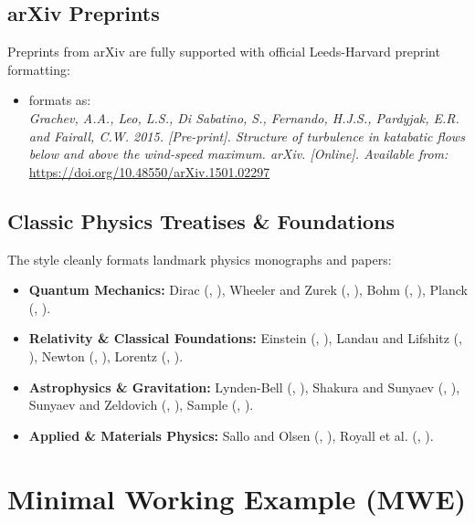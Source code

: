 \documentclass[a4paper,11pt]{article}
\begin{document}
\subsection{arXiv Preprints}
Preprints from arXiv are fully supported with official Leeds-Harvard preprint formatting:
\begin{itemize}
  \item \textcite{2015arXiv150102297G} formats as: \\
    \emph{Grachev, A.A., Leo, L.S., Di Sabatino, S., Fernando, H.J.S., Pardyjak, E.R. and Fairall, C.W. 2015. [Pre-print]. Structure of turbulence in katabatic flows below and above the wind-speed maximum. arXiv. [Online]. Available from:} \url{https://doi.org/10.48550/arXiv.1501.02297}
\end{itemize}

\subsection{Classic Physics Treatises \& Foundations}
The style cleanly formats landmark physics monographs and papers:
\begin{itemize}
  \item \textbf{Quantum Mechanics:} Dirac (\citeyear{dirac1958}, \parencite{dirac1958}), Wheeler and Zurek (\citeyear{wheeler1983}, \parencite{wheeler1983}), Bohm (\citeyear{bohm1983}, \parencite{bohm1983}), Planck (\citeyear{planck1922}, \parencite{planck1922}).
  \item \textbf{Relativity \& Classical Foundations:} Einstein (\citeyear{einstein1920}, \parencite{einstein1920}), Landau and Lifshitz (\citeyear{landau1976}, \parencite{landau1976}), Newton (\citeyear{newton1999}, \parencite{newton1999}), Lorentz (\citeyear{lorentz1952}, \parencite{lorentz1952}).
  \item \textbf{Astrophysics \& Gravitation:} Lynden-Bell (\citeyear{1967MNRAS.136..101L}, \parencite{1967MNRAS.136..101L}), Shakura and Sunyaev (\citeyear{shakura1973}, \parencite{shakura1973}), Sunyaev and Zeldovich (\citeyear{1970CoASP...2...66S}, \parencite{1970CoASP...2...66S}), Sample (\citeyear{sample2016}, \parencite{sample2016}).
  \item \textbf{Applied \& Materials Physics:} Sallo and Olsen (\citeyear{sallo1961}, \parencite{sallo1961}), Royall et al. (\citeyear{royall2013}, \parencite{royall2013}).
\end{itemize}

\section{Minimal Working Example (MWE)}
\end{document}
